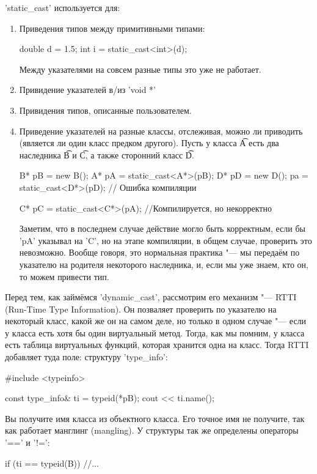 \cpp'static_cast' используется для:
\begin{enumerate}
\item
        Приведения типов между примитивными типами:
\begin{cppcode}
        double d = 1.5;
        int i = static_cast<int>(d);
\end{cppcode}
        Между указателями на совсем разные типы это уже не работает.
 
\item
        Привидение указателей в/из \cpp'void *'
 
\item
        Привидения типов, описанные пользователем.
 
\item
        Приведение указателей на разные классы, отслеживая, можно ли приводить (является ли один класс предком другого).
        Пусть у класса \t{A} есть два наследника \t{B} и \t{C}, а также сторонний класс \t{D}.
\begin{cppcode}
B* pB = new B();
A* pA = static_cast<A*>(pB);
D* pD = new D();
pa = static_cast<D*>(pD); // Ошибка компиляции
 
C* pC = static_cast<C*>(pA); //Компилируется, но некорректно
\end{cppcode}
        Заметим, что в последнем случае действие могло быть корректным, если бы \cpp'pA' указывал на \cpp'C',
        но на этапе компиляции, в общем случае, проверить это невозможно.
        Вообще говоря, это нормальная практика "--- мы передаём по указателю на родителя некоторого наследника,
        и, если мы уже знаем, кто он, то можем привести тип.
\end{enumerate}
 
Перед тем, как займёмся \cpp'dynamic_cast', рассмотрим его механизм "--- RTTI (Run-Time Type Information).
Он позваляет проверить по указателю на некоторый класс, какой же он на самом деле,
но только в одном случае "--- если у класса есть хотя бы один виртуальный метод.
Тогда, как мы помним, у класса есть таблица виртуальных функций, которая хранится одна на класс.
Тогда RTTI добавляет туда поле: структуру \cpp'type_info':
\begin{cppcode}
#include <typeinfo>
 
const type_info& ti = typeid(*pB);
cout << ti.name();
\end{cppcode}
Вы получите имя класса из объектного класса.
Его точное имя не получите, так как работает манглинг (mangling).
У структуры так же определены операторы \cpp'==' и \cpp'!=':
\begin{cppcode}
if (ti == typeid(B))
        //...
\end{cppcode}
 
